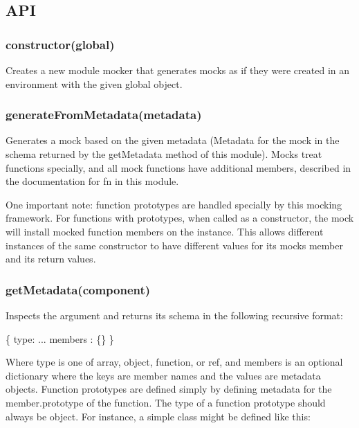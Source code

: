 \subsection*{A\+PI}

\subsubsection*{{\ttfamily constructor(global)}}

Creates a new module mocker that generates mocks as if they were created in an environment with the given global object.

\subsubsection*{{\ttfamily generate\+From\+Metadata(metadata)}}

Generates a mock based on the given metadata (Metadata for the mock in the schema returned by the get\+Metadata method of this module). Mocks treat functions specially, and all mock functions have additional members, described in the documentation for {\ttfamily fn} in this module.

One important note\+: function prototypes are handled specially by this mocking framework. For functions with prototypes, when called as a constructor, the mock will install mocked function members on the instance. This allows different instances of the same constructor to have different values for its mocks member and its return values.

\subsubsection*{{\ttfamily get\+Metadata(component)}}

Inspects the argument and returns its schema in the following recursive format\+:


\begin{DoxyCode}
\{
  type: ...
  members : \{\}
\}
\end{DoxyCode}


Where type is one of {\ttfamily array}, {\ttfamily object}, {\ttfamily function}, or {\ttfamily ref}, and members is an optional dictionary where the keys are member names and the values are metadata objects. Function prototypes are defined simply by defining metadata for the {\ttfamily member.\+prototype} of the function. The type of a function prototype should always be {\ttfamily object}. For instance, a simple class might be defined like this\+:


